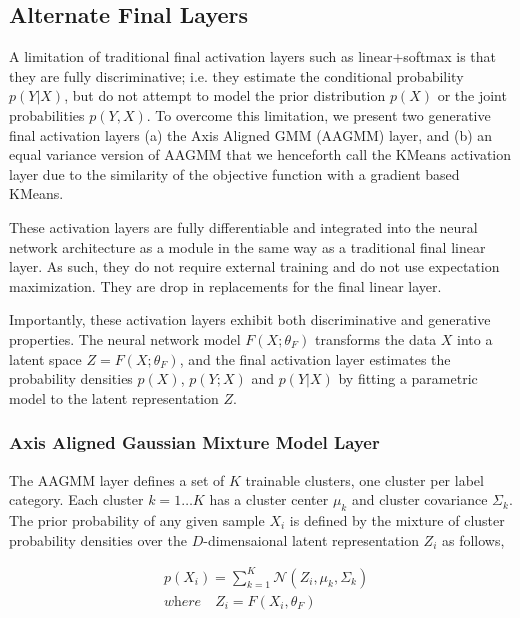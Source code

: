 \documentclass[10pt,twocolumn,letterpaper]{article}
\begin{document}
\subsection{Alternate Final Layers}

A limitation of traditional final activation layers such as linear+softmax is that they are fully discriminative; i.e. they estimate the conditional probability $p(Y|X)$, but do not attempt to model the prior distribution $p(X)$ or the joint probabilities $p(Y,X)$. 
To overcome this limitation, we present two generative final activation layers (a) the Axis Aligned GMM (AAGMM) layer, and (b) an equal variance version of AAGMM that we henceforth call the KMeans activation layer due to the similarity of the objective function with a gradient based KMeans.

These activation layers are fully differentiable and integrated into the neural network architecture as a module in the same way as a traditional final linear layer. 
As such, they do not require external training and do not use expectation maximization.
They are drop in replacements for the final linear layer.

Importantly, these activation layers exhibit both discriminative and generative properties. 
The neural network model $F(X;\theta_F)$ transforms the data $X$ into a latent space $Z = F(X;\theta_F)$, and the final activation layer estimates the probability densities $p(X)$, $p(Y;X)$ and $p(Y|X)$ by fitting a parametric model to the latent representation $Z$.

\subsubsection{Axis Aligned Gaussian Mixture Model Layer}

The AAGMM layer defines a set of $K$ trainable clusters, one cluster per label category. 
Each cluster $k=1 \dots K$ has a cluster center $\mu_k$ and cluster covariance $\Sigma_k$. 
The prior probability of any given sample $X_i$ is defined by the mixture of cluster probability densities over the $D$-dimensaional latent representation $Z_i$ as follows,

\begin{equation}
	\begin{aligned}
		\label{eq_px}
		&p(X_i) = \sum_{k=1}^K \mathcal{N} (Z_i, \mu_{k}, \Sigma_k)
		\\[10pt]
		&\textit{where} \quad Z_i = F(X_i, \theta_F)
	\end{aligned}
\end{equation}
\end{document}
